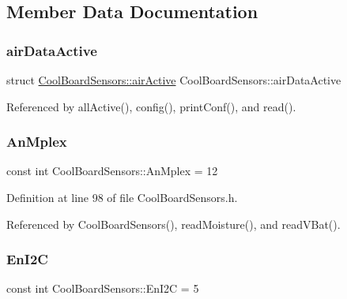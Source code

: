\subsection{Member Data Documentation}
\mbox{\label{classCoolBoardSensors_abff8dfeccb2f7689847bb64d5f1cd31e}} 
\subsubsection{\texorpdfstring{air\+Data\+Active}{airDataActive}}
{\footnotesize\ttfamily struct \hyperlink{structCoolBoardSensors_1_1airActive}{Cool\+Board\+Sensors\+::air\+Active} Cool\+Board\+Sensors\+::air\+Data\+Active\hspace{0.3cm}{\ttfamily [private]}}



Referenced by all\+Active(), config(), print\+Conf(), and read().

\mbox{\label{classCoolBoardSensors_a12ef28b1046219e0aee10bf64e28c4a5}} 
\subsubsection{\texorpdfstring{An\+Mplex}{AnMplex}}
{\footnotesize\ttfamily const int Cool\+Board\+Sensors\+::\+An\+Mplex = 12\hspace{0.3cm}{\ttfamily [private]}}



Definition at line 98 of file Cool\+Board\+Sensors.\+h.



Referenced by Cool\+Board\+Sensors(), read\+Moisture(), and read\+V\+Bat().

\mbox{\label{classCoolBoardSensors_aaa6b5dbf3a6633bffd9d204d961096dc}} 
\subsubsection{\texorpdfstring{En\+I2C}{EnI2C}}
{\footnotesize\ttfamily const int Cool\+Board\+Sensors\+::\+En\+I2C = 5\hspace{0.3cm}{\ttfamily [private]}}



